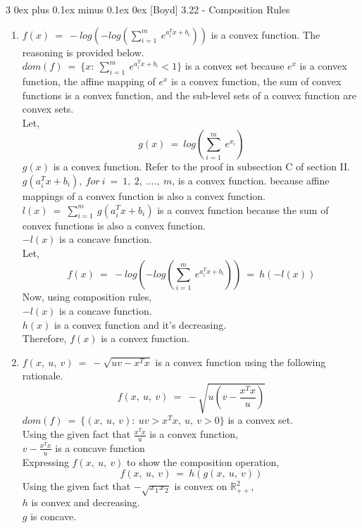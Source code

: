 \documentclass[12pt, draftcls, onecolumn]{IEEEtran}
\makeatletter
\def\subsubsection{\@startsection{subsubsection}%
                                 {3}%
                                 {\z@}%
                                 {0ex plus 0.1ex minus 0.1ex}%
                                 {0ex}%
                                 {\normalfont\normalsize\bfseries}}%
\makeatother
\begin{document}
\subsubsection{[Boyd] 3.22 - Composition Rules}
\begin{enumerate}
    \item $f(x)\ =\ -log(-log(\sum_{i=1}^m\ e^{a_i^Tx + b_i}))$ is a convex function. The reasoning is provided below.
    \\$dom(f)\ =\ \{x:\ \sum_{i=1}^m\ e^{a_i^{T}x+b_i} < 1\}$ is a convex set because $e^x$ is a convex function, the affine mapping of $e^x$ is a convex function, the sum of convex functions is a convex function, and the sub-level sets of a convex function are convex sets.
    \\Let,
    \[g(x)\ =\ log(\sum_{i=1}^m\ e^{x_i})\]
    $g(x)$ is a convex function. Refer to the proof in subsection C of section II.
    \\$g(a_i^Tx+b_i),\ for\ i\ =\ 1,\ 2,\ ....,\ m$, is a convex function. because affine mappings of a convex function is also a convex function.
    \\$l(x)\ =\ \sum_{i=1}^m\ g(a_i^Tx+b_i)$ is a convex function because the sum of convex functions is also a convex function.
    \\$-l(x)$ is a concave function.
    \\Let,
    \[f(x)\ =\ -log(-log(\sum_{i=1}^m\ e^{a_i^Tx + b_i}))\ =\ h(-l(x))\]
    Now, using composition rules,
    \\$-l(x)$ is a concave function.
    \\$h(x)$ is a convex function and it's decreasing.
    \\Therefore, $f(x)$ is a convex function.
    \item $f(x,\ u,\ v)\ =\ -\sqrt{uv - x^Tx}$ is a convex function using the following rationale.
    \[f(x,\ u,\ v)\ =\ -\sqrt{u(v - \frac{x^Tx}{u})}\]
    $dom(f)\ =\ \{(x,\ u,\ v):\ uv > x^Tx,\ u,\ v >0\}$ is a convex set.
    \\Using the given fact that $\frac{x^Tx}{u}$ is a convex function,
    \\$v - \frac{x^Tx}{u}$ is a concave function
    \\Expressing $f(x,\ u,\ v)$ to show the composition operation,
    \[f(x,\ u,\ v)\ =\ h(g(x,\ u,\ v))\]
    Using the given fact that $-\sqrt{x_1x_2}$ is convex on $\mathbb{R}^2_{++}$,
    \\$h$ is convex and decreasing.
    \\$g$ is concave.

\end{enumerate}
\end{document}
